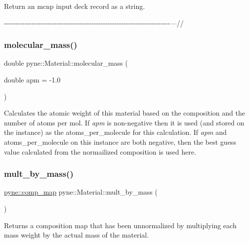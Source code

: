Return an mcnp input deck record as a string. 

-\/-\/-\/-\/-\/-\/-\/-\/-\/-\/-\/-\/-\/-\/-\/-\/-\/-\/-\/-\/-\/-\/-\/-\/-\/-\/-\/-\/-\/-\/-\/-\/-\/-\/-\/-\/-\/-\/-\/-\/-\/-\/-\/-\/-\/-\/-\/-\/-\/-\/-\/-\/-\/-\/-\/-\/-\/-\/-\/-\/-\/-\/-\/-\/-\/-\/-\/-\/-\/-\/-\/-\/---// \mbox{\label{classpyne_1_1_material_a5adf1c262bbabfadf5a8491e7a434ae5}} 
\subsubsection{\texorpdfstring{molecular\+\_\+mass()}{molecular\_mass()}}
{\footnotesize\ttfamily double pyne\+::\+Material\+::molecular\+\_\+mass (\begin{DoxyParamCaption}\item[{double}]{apm = {\ttfamily -\/1.0} }\end{DoxyParamCaption})}

Calculates the atomic weight of this material based on the composition and the number of atoms per mol. If {\itshape apm} is non-\/negative then it is used (and stored on the instance) as the atoms\+\_\+per\+\_\+molecule for this calculation. If {\itshape apm} and atoms\+\_\+per\+\_\+molecule on this instance are both negative, then the best guess value calculated from the normailized composition is used here. \mbox{\label{classpyne_1_1_material_ad561ad2e529cbdcc0c73b10b067289fd}} 
\subsubsection{\texorpdfstring{mult\+\_\+by\+\_\+mass()}{mult\_by\_mass()}}
{\footnotesize\ttfamily \hyperlink{namespacepyne_a86738cecccf4ce3f4ecc2ff6f45ce1a2}{pyne\+::comp\+\_\+map} pyne\+::\+Material\+::mult\+\_\+by\+\_\+mass (\begin{DoxyParamCaption}{ }\end{DoxyParamCaption})}

Returns a composition map that has been unnormalized by multiplying each mass weight by the actual mass of the material. \mbox{\label{classpyne_1_1_material_ad27e37568bc08020d3886bb6284bc61d}} 
